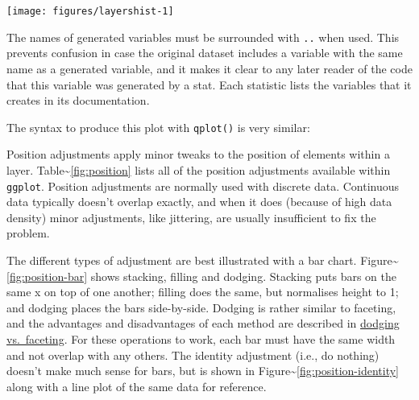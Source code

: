 \texttt{[image: figures/layershist-1]}

The names of generated variables must be surrounded with \texttt{..}
when used. This prevents confusion in case the original dataset includes
a variable with the same name as a generated variable, and it makes it
clear to any later reader of the code that this variable was generated
by a stat. Each statistic lists the variables that it creates in its
documentation. 

The syntax to produce this plot with \texttt{qplot()} is very similar:

\begin{Shaded}
\begin{Highlighting}[]
 \NormalTok{, }
   \NormalTok{)}
\end{Highlighting}
\end{Shaded}


Position adjustments apply minor tweaks to the position of elements
within a layer. Table\textasciitilde{}\ref{fig:position} lists all of
the position adjustments available within \texttt{ggplot}. Position
adjustments are normally used with discrete data. Continuous data
typically doesn't overlap exactly, and when it does (because of high
data density) minor adjustments, like jittering, are usually
insufficient to fix the problem. 
 



The different types of adjustment are best illustrated with a bar chart.
Figure\textasciitilde{}\ref{fig:position-bar} shows stacking, filling
and dodging. Stacking puts bars on the same x on top of one another;
filling does the same, but normalises height to 1; and dodging places
the bars side-by-side. Dodging is rather similar to faceting, and the
advantages and disadvantages of each method are described in
\hyperref[sub:dodge-vs-facet]{dodging vs.~faceting}. For these
operations to work, each bar must have the same width and not overlap
with any others. The identity adjustment (i.e., do nothing) doesn't make
much sense for bars, but is shown in
Figure\textasciitilde{}\ref{fig:position-identity} along with a line
plot of the same data for reference. 
 
  


